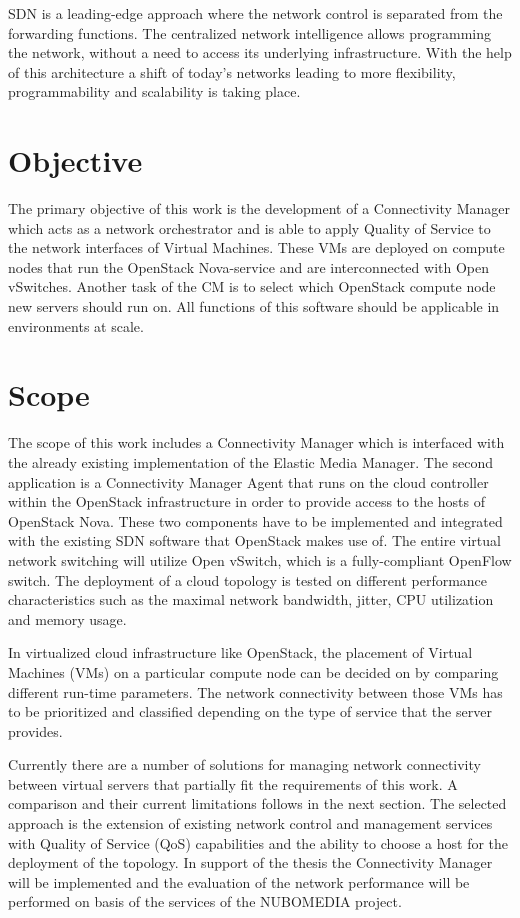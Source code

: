 SDN is a leading-edge approach where the network control is separated from the forwarding functions. The centralized network intelligence allows programming the network, without a need to access its underlying infrastructure. With the help of this architecture a shift of today's networks leading to more flexibility, programmability and scalability is taking place.

\section{Objective}

The primary objective of this work is the development of a Connectivity Manager which acts as a network orchestrator and is able to apply Quality of Service to the network interfaces of Virtual Machines. These VMs are deployed on compute nodes that run the OpenStack Nova-service and are interconnected with Open vSwitches. Another task of the CM is to select which OpenStack compute node new servers should run on. All functions of this software should be applicable in environments at scale.

\section{Scope}
The scope of this work includes a Connectivity Manager which is interfaced with the already existing implementation of the Elastic Media Manager. The second application is a Connectivity Manager Agent that runs on the cloud controller within the OpenStack infrastructure in order to provide access to the hosts of OpenStack Nova. These two components have to be implemented and integrated with the existing SDN software that OpenStack makes use of. The entire virtual network switching will utilize Open vSwitch, which is a fully-compliant OpenFlow switch. The deployment of a cloud topology is tested on different performance characteristics such as the maximal network bandwidth, jitter, CPU utilization and memory usage.

In virtualized cloud infrastructure like OpenStack, the placement of Virtual Machines (VMs) on a particular compute node can be decided on by comparing different run-time parameters. The network connectivity between those VMs has to be prioritized and classified depending on the type of service that the server provides.

Currently there are a number of solutions for managing network connectivity between virtual servers that partially fit the requirements of this work. A comparison and their current limitations follows in the next section. The selected approach is the extension of existing network control and management services with Quality of Service (QoS) capabilities and the ability to choose a host for the deployment of the topology. In support of the thesis the Connectivity Manager will be implemented and the evaluation of the network performance will be performed on basis of the services of the NUBOMEDIA project.

